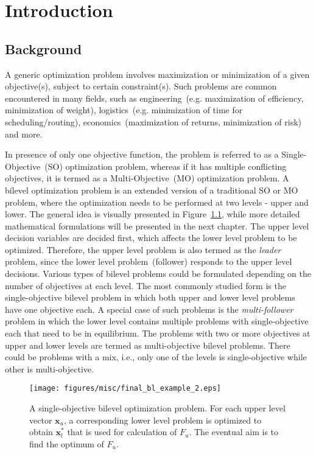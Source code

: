 \chapter{Introduction}
\label{chapter:1}

\section{Background}


A generic optimization problem involves maximization or minimization of a given objective(s), subject to certain constraint(s). Such problems are common encountered in many fields, such as engineering~(e.g. maximization of efficiency, minimization of weight), logistics~(e.g. minimization of time for scheduling/routing), economics~(maximization of returns, minimization of risk) and more. 

In presence of only one objective function, the problem is referred to as a Single-Objective~(SO) optimization problem, whereas if it has multiple conflicting objectives, it is termed as a Multi-Objective~(MO) optimization problem. A bilevel optimization problem is an extended version of a traditional SO or MO problem, where the optimization needs to be performed at two levels - upper and lower. The general idea is visually presented in Figure~\ref{fig:exam_chp_1}, while more detailed mathematical formulations will be presented in the next chapter. The upper level decision variables are decided first, which affects the lower level problem to be optimized. Therefore, the upper level problem is also termed as the \emph{leader} problem, since the lower level problem~(follower) responds to the upper level decisions. Various types of bilevel problems could be formulated depending on the number of objectives at each level. The most commonly studied form is the single-objective bilevel problem in which both upper and lower level problems have one objective each. A special case of such problems is the \emph{multi-follower} problem in which the lower level contains multiple problems with single-objective each that need to be in equilibrium. The problems with two or more objectives at upper and lower levels are termed as multi-objective bilevel problems. There could be problems with a mix, i.e., only one of the levels is single-objective while other is multi-objective. 

\begin{figure}[!ht]
\centering
\texttt{[image: figures/misc/final\_bl\_example\_2.eps]}
\caption{{A single-objective bilevel optimization problem. For each upper level vector $\mathbf{x}_u$, a corresponding lower level problem is optimized to obtain $\mathbf{x}^*_l$} that is used for calculation of $F_u$. The eventual aim is to find the optimum of $F_u$.}
\label{fig:exam_chp_1}
\end{figure}

